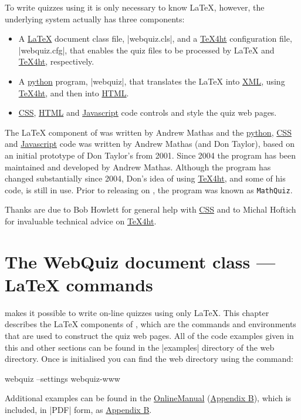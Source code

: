 \documentclass[svgnames]{article}
\newcommand\TeXfht{\href{https://www.ctan.org/tex4ht}{TeX4ht}\xspace}
\newcommand\Ctan{\ctan[]{ctan}\xspace}
\newcommand{\HTML}{\href{https://www.w3schools.com/html/html_intro.asp}{HTML}\xspace}
\newcommand\CSS{\href{https://www.w3schools.com/css}{CSS}\xspace}
\newcommand\XML{\href{https://www.w3schools.com/xml/xml_whatis.asp}{XML}\xspace}
\newcommand\Javascript{\href{https://www.w3schools.com/Js/}{Javascript}\xspace}
\newcommand\python[1][python]{\href{https://www.python.org/}{#1}\xspace}
\newcommand\OnlineManual{\href{http://www.maths.usyd.edu.au/u/mathas/WebQuiz/webquiz-online-manual.html}{OnlineManual} (\hyperref[S:online]{Appendix B})\xspace}
\begin{document}
      To write quizzes using \WebQuiz it is only necessary to know
      \LaTeX, however, the underlying \WebQuiz system actually has three
      components:
      \begin{itemize}
        \item A \href{https://www.latex-project.org/}{\LaTeX} document class
        file, \BashCode|webquiz.cls|, and a \TeXfht
        configuration file, \BashCode|webquiz.cfg|, that enables the
        quiz files to be processed by \LaTeX{} and \TeXfht, respectively.
        \item A \python program,
        \BashCode|webquiz|, that translates the
        \LaTeX{} into \XML, using \TeXfht, and then into \HTML.
        \item \CSS, \HTML and \Javascript code controls and style the
        quiz web pages.
      \end{itemize}

     The \LaTeX{} component of \WebQuiz{} was written by Andrew Mathas and
     the \python, \CSS and \Javascript code was written by Andrew Mathas (and
     Don Taylor), based on an initial prototype of Don Taylor's from 2001.
     Since 2004 the program has been maintained and developed by Andrew
     Mathas. Although the program has changed substantially since 2004,
     Don's idea of using \TeXfht, and some of his code, is still
     in use. Prior to releasing \WebQuiz on \Ctan, the program was known
     as \texttt{MathQuiz}.

     Thanks are due to Bob Howlett for general help with \CSS and to
     Michal Hoftich for invaluable technical advice on \TeXfht.

   \section{The WebQuiz document class --- \LaTeX{} commands}
   \label{S:documentclass}

    \WebQuiz makes it possible to write on-line quizzes using only \LaTeX.
    This chapter describes the \LaTeX{} components of \WebQuiz, which are
    the commands and environments that are used to construct the quiz web
    pages. All of the code examples given in this and other sections can
    be found in the \BashCode|examples| directory of the \WebQuiz web
    directory. Once \WebQuiz is initialised you can find the
    \WebQuiz web directory using the command:
    \begin{bashcode}
         webquiz --settings webquiz-www
    \end{bashcode}
    Additional examples can be found in the \OnlineManual, which is
    included, in \BashCode|PDF| form, as \hyperref[S:online]{Appendix B}.
\end{document}
